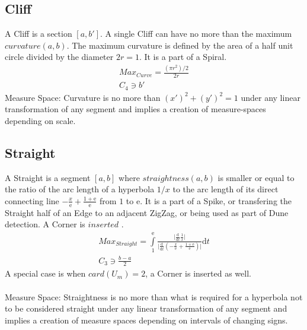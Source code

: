 \documentclass{report}
\begin{document}
\subsection{Cliff}
A Cliff is a section $[a,b']$. A single Cliff can have no more than the maximum $curvature(a,b)$. The maximum curvature is defined by the area of a half unit circle divided by the diameter $2r=1$. It is a part of a Spiral.
\begin{align}
Max_{Curve}=\frac{(\pi r^2) /2}{2r}\\
C_{4} \ni b'
\end{align}
Measure Space: Curvature is no more than $(x')^2 + (y')^2 =1$  under any linear transformation of any segment and implies a creation of measure-spaces depending on scale.
\iffalse
\subsection*{Half Cliff}
Even though Half Cliffs are not being used, it is worth mentioning, that they produce Corners just to make the notation complete.
\begin{align}
Max_{Quarter}=\frac{((\pi-2) r^2) /4}{r}\\
C_{3} \ni b'
\end{align}
\fi

\subsection{Straight}
A Straight is a segment $[a,b]$ where $straightness(a,b)$ is smaller or equal to the ratio of the arc length of a hyperbola $1/x$ to the arc length of its direct connecting line $-\frac{x}{\mathrm{e}}+\frac{1+\mathrm{e}}{\mathrm{e}}$ from $1$ to $\mathrm{e}$. It is a part of a Spike, or transfering the Straight half of an Edge to an adjacent ZigZag, or being used as part of Dune detection. A Corner is $inserted$ .
\begin{align}
Max_{Straight}=\int \limits _{1}^{\mathrm{e}}\frac{\lvert\frac{\mathrm{d}}{\mathrm{d}t}\frac{1}{x}\rvert}{\lvert\frac{\mathrm{d}}{\mathrm{d}t}(-\frac{x}{\mathrm{e}}+\frac{1+\mathrm{e}}{\mathrm{e}})\rvert}\mathrm{d}t\\
C_{3} \ni \frac{b-a}{2}
\end{align}
A special case is when $card(U_{m})=2$, a Corner is inserted as well.\\\\
Measure Space: Straightness is no more than what is required for a hyperbola not to be considered straight under any linear transformation of any segment and implies a creation of measure spaces depending on intervals of changing signs.
\end{document}
